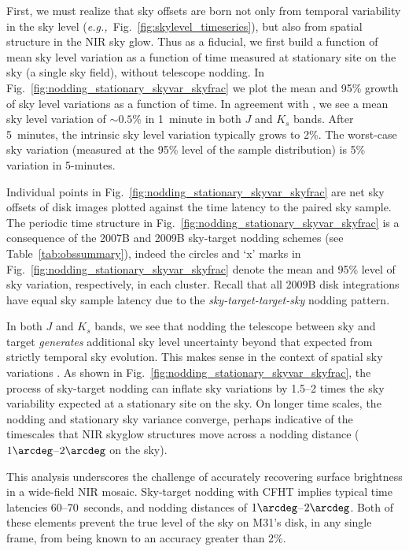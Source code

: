 \documentclass[iop]{emulateapj}
\newcommand{\eg}{\textit{e.g.,~}}
\newcommand{\mycomment}[1]{\textcolor{OliveGreen}{\textit{#1}}} %
\newcommand{\Fig}[1]{Fig.~\ref{fig:#1}}  %
\newcommand{\Tab}[1]{Table~\ref{tab:#1}}  %
\begin{document}
First, we must realize that sky offsets are born not only from temporal variability in the sky level (\eg \Fig{skylevel_timeseries}), but also from spatial structure in the NIR sky glow.
Thus as a fiducial, we first build a function of mean sky level variation as a function of time measured at stationary site on the sky (a single sky field), without telescope nodding.
In \Fig{nodding_stationary_skyvar_skyfrac} we plot the mean and 95\% growth of sky level variations as a function of time.
In agreement with \cite{Vaduvescu:2004}, we see a mean sky level variation of $\sim 0.5\%$ in 1~minute in both $J$ and $K_s$ bands.
After 5~minutes, the intrinsic sky level variation typically grows to 2\%.
The worst-case sky variation (measured at the 95\% level of the sample distribution) is 5\% variation in 5-minutes.

Individual points in \Fig{nodding_stationary_skyvar_skyfrac} are net sky offsets of disk images plotted against the time latency to the paired sky sample.
The periodic time structure in \Fig{nodding_stationary_skyvar_skyfrac} is a consequence of the 2007B and 2009B sky-target nodding schemes (see \Tab{obssummary}), indeed the circles and `x' marks in \Fig{nodding_stationary_skyvar_skyfrac} denote the mean and 95\% level of sky variation, respectively, in each cluster.
Recall that all 2009B disk integrations have equal sky sample latency due to the \emph{sky-target-target-sky} nodding pattern.

In both $J$ and $K_s$ bands, we see that nodding the telescope between sky and target \emph{generates} additional sky level uncertainty beyond that expected from strictly temporal sky evolution.
This makes sense in the context of spatial sky variations \citep{Adams:1996}.
As shown in \Fig{nodding_stationary_skyvar_skyfrac}, the process of sky-target nodding can inflate sky variations by 1.5--2 times the sky variability expected at a stationary site on the sky.
On longer time scales, the nodding and stationary sky variance converge, perhaps indicative of the timescales that NIR skyglow structures move across a nodding distance ($1\arcdeg$--$2\arcdeg$ on the sky).


This analysis underscores the challenge of accurately recovering surface brightness in a wide-field NIR mosaic.
Sky-target nodding with CFHT implies typical time latencies 60--70~seconds, and nodding distances of $1\arcdeg$--$2\arcdeg$.
Both of these elements prevent the true level of the sky on M31's disk, in any single frame, from being known to an accuracy greater than 2\%.
\end{document}

